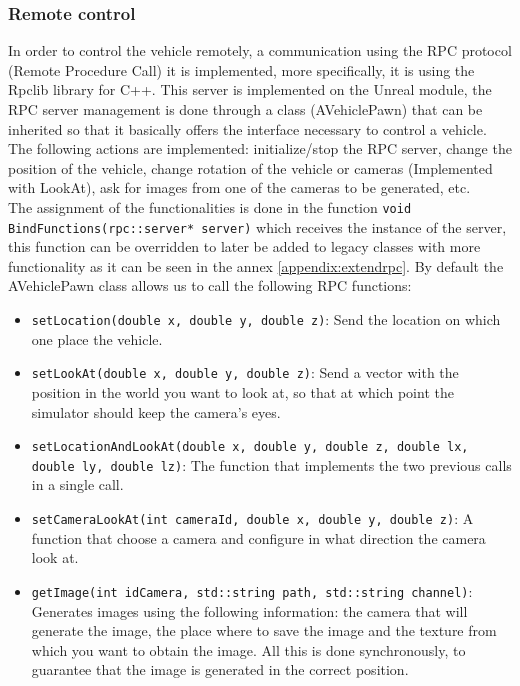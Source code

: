 \documentclass[10pt,a4paper,twocolumn,twoside]{article}
\begin{document}
\subsubsection{Remote control}
\label{rpcserver}

In order to control the vehicle remotely, a communication using the RPC protocol (Remote Procedure Call) it is implemented, more specifically, it is using the Rpclib \cite{rpclib} library for C++. This server is implemented on the Unreal module, the RPC server management is done through a class (AVehiclePawn) that can be inherited so that it basically offers the interface necessary to control a vehicle. The following actions are implemented: initialize/stop the RPC server, change the position of the vehicle, change rotation of the vehicle or cameras (Implemented with LookAt), ask for images from one of the cameras to be generated, etc.
\\
The assignment of the functionalities is done in the function {\tt void BindFunctions(rpc::server* server)} which receives the instance of the server, this function can be overridden to later be added to legacy classes with more functionality as it can be seen in the annex \ref{appendix:extendrpc}. By default the AVehiclePawn class allows us to call the following RPC functions:

\begin{itemize}
\setlength\itemsep{0em}
\item {\tt setLocation(double x, double y, double z)}: Send the location on which one place the vehicle.

\item {\tt setLookAt(double x, double y, double z)}: Send a vector with the position in the world you want to look at, so that at which point the simulator should keep the camera's eyes.

\item {\tt setLocationAndLookAt(double x, double y, double z, double lx, double ly, double lz)}: The function that implements the two previous calls in a single call.

\item {\tt setCameraLookAt(int cameraId, double x, double y, double z)}: A function that choose a camera and configure in what direction the camera look at.

\item {\tt getImage(int idCamera, std::string path, std::string channel)}: Generates images using the following information: the camera that will generate the image, the place where to save the image and the texture from which you want to obtain the image. All this is done synchronously, to guarantee that the image is generated in the correct position.
\end{itemize}
\end{document}
